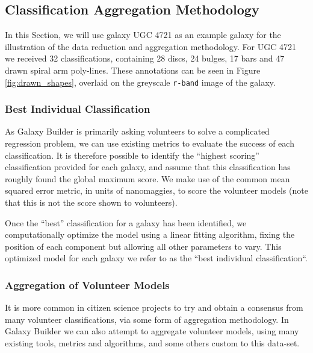 \documentclass[../main.tex]{subfiles}
\begin{document}
\subsection{Classification Aggregation Methodology}

In this Section, we will use galaxy UGC 4721 as an example galaxy for the illustration of the data reduction and aggregation methodology. For UGC 4721 we received 32 classifications, containing 28 discs, 24 bulges, 17 bars and 47 drawn spiral arm poly-lines. These annotations can be seen in Figure \ref{fig:drawn_shapes}, overlaid on the greyscale \texttt{r-band} image of the galaxy.

\subsubsection{Best Individual Classification}

As Galaxy Builder is primarily asking volunteers to solve a complicated regression problem, we can use existing metrics to evaluate the success of each classification. It is therefore possible to identify the ``highest scoring'' classification provided for each galaxy, and assume that this classification has roughly found the global maximum score. We make use of the common mean squared error metric, in units of nanomaggies, to score the volunteer models (note that this is not the score shown to volunteers).

Once the ``best'' classification for a galaxy has been identified, we computationally optimize the model using a linear fitting algorithm, fixing the position of each component but allowing all other parameters to vary. This optimized model for each galaxy we refer to as the ``best individual classification``.

\subsubsection{Aggregation of Volunteer Models}
\label{sec:aggregation_of_volunteer_models}

It is more common in citizen science projects to try and obtain a consensus from many volunteer classifications, via some form of aggregation methodology. In Galaxy Builder we can also attempt to aggregate volunteer models, using many existing tools, metrics and algorithms, and some others custom to this data-set.
\end{document}
